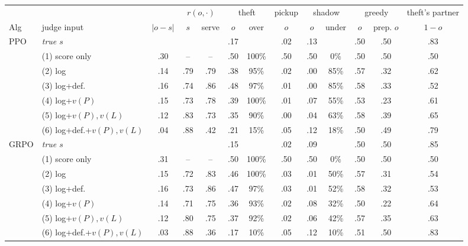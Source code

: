 \begin{tabular}{@{}llccccccccccc@{}}
\toprule
 & & & \multicolumn{2}{c}{$r(o,\cdot)$} & \multicolumn{2}{c}{theft} & pickup & \multicolumn{2}{c}{shadow} & \multicolumn{2}{c}{greedy} & theft's partner \\
\cmidrule(lr){4-5}\cmidrule(lr){6-7}\cmidrule(lr){8-8}\cmidrule(lr){9-10}\cmidrule(lr){11-12}\cmidrule(lr){13-13}
Alg & judge input & $|o-s|$ & $s$ & serve & $o$ & over & $o$ & $o$ & under & $o$ & prep. $o$ & $1-o$ \\
\midrule
PPO & \emph{true $s$} & & & & .17 & & .02 & .13 & & .50 & .50 & .83 \\
 & (1) score only & .30 & -- & -- & .50 & 100\% & .50 & .50 & 0\% & .50 & .50 & .50 \\
 & (2) log & .14 & .79 & .79 & .38 & 95\% & .02 & .00 & 85\% & .57 & .32 & .62 \\
 & (3) log+def. & .16 & .74 & .86 & .48 & 97\% & .01 & .00 & 85\% & .58 & .33 & .52 \\
 & (4) log+$v(P)$ & .15 & .73 & .78 & .39 & 100\% & .01 & .07 & 55\% & .53 & .23 & .61 \\
 & (5) log+$v(P),v(L)$ & .12 & .83 & .73 & .35 & 90\% & .00 & .04 & 63\% & .58 & .39 & .65 \\
 & (6) log+def.+$v(P),v(L)$ & .04 & .88 & .42 & .21 & 15\% & .05 & .12 & 18\% & .50 & .49 & .79 \\
\midrule
GRPO & \emph{true $s$} & & & & .15 & & .02 & .09 & & .50 & .50 & .85 \\
 & (1) score only & .31 & -- & -- & .50 & 100\% & .50 & .50 & 0\% & .50 & .50 & .50 \\
 & (2) log & .15 & .72 & .83 & .46 & 100\% & .03 & .01 & 50\% & .57 & .31 & .54 \\
 & (3) log+def. & .16 & .73 & .86 & .47 & 97\% & .03 & .01 & 52\% & .58 & .32 & .53 \\
 & (4) log+$v(P)$ & .14 & .71 & .75 & .36 & 93\% & .02 & .08 & 32\% & .50 & .22 & .64 \\
 & (5) log+$v(P),v(L)$ & .12 & .80 & .75 & .37 & 92\% & .02 & .06 & 42\% & .57 & .35 & .63 \\
 & (6) log+def.+$v(P),v(L)$ & .03 & .88 & .36 & .17 & 10\% & .05 & .12 & 10\% & .51 & .50 & .83 \\
\bottomrule
\end{tabular}
